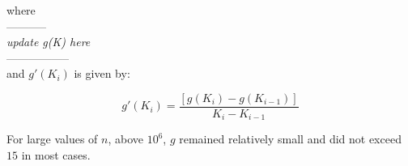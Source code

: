 where\\
-----------\\
\textit{update g(K) here}\\
-----------------\\

and $g'(K_i)$ is given by:
 
\begin{equation}
g'(K_i) = \frac{[g(K_i) - g(K_{i-1})]}{K_i - K_{i-1}}
\end{equation} 

For large values of $n$, above $10^6$, $g$ remained relatively small and did not exceed $15$ in most cases.
